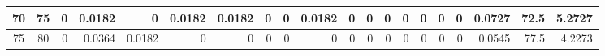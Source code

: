 \begin{table}[ht]
\begin{adjustbox}{width = \textwidth, center}
\begin{tabular}{|cc|r|r|r|r|r|r|r|r|r|r|r|r|r|r|r|rrr|}
        \cellcolor[HTML]{C8E4BE}70           & \cellcolor[HTML]{D9EAD3}75          & 0                                              & \cellcolor[HTML]{C7E9D8}0.0182                 & 0                                              & \cellcolor[HTML]{C7E9D8}0.0182                 & \cellcolor[HTML]{C7E9D8}0.0182                 & 0                                              & 0                                              & \cellcolor[HTML]{C7E9D8}0.0182                  & 0                                               & 0                                               & 0                                               & 0                                               & 0                                               & 0                                               & 0                                               & \multicolumn{1}{r|}{\cellcolor[HTML]{D9D2E9}0.0727}                                   & \multicolumn{1}{r|}{\cellcolor[HTML]{D9D2E9}72.5}                       & \cellcolor[HTML]{D9D2E9}5.2727                                                              \\ \hline
        \rowcolor[HTML]{FFFFFF} 
        \cellcolor[HTML]{C8E4BE}75           & \cellcolor[HTML]{D9EAD3}80          & 0                                              & \cellcolor[HTML]{8FD2B1}0.0364                 & \cellcolor[HTML]{C7E9D8}0.0182                 & 0                                              & 0                                              & 0                                              & 0                                              & 0                                               & 0                                               & 0                                               & 0                                               & 0                                               & 0                                               & 0                                               & 0                                               & \multicolumn{1}{r|}{\cellcolor[HTML]{D9D2E9}0.0545}                                   & \multicolumn{1}{r|}{\cellcolor[HTML]{D9D2E9}77.5}                       & \cellcolor[HTML]{D9D2E9}4.2273                                                              \\ \hline

\end{tabular}
\end{adjustbox}
\end{table}
